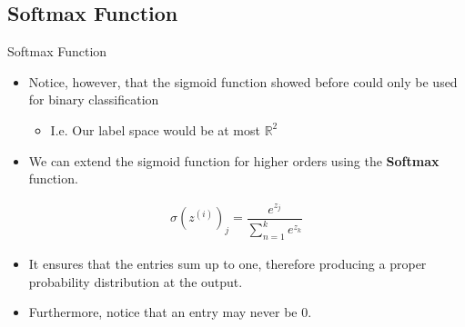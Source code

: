 \subsection{Softmax Function}
\begin{frame}{Softmax Function}
	\begin{itemize}
		\item Notice, however, that the sigmoid function showed before could only be used for binary classification
		\begin{itemize}
			\item I.e. Our label space would be at most $\mathbb{R}^2$
		\end{itemize}
		\item We can extend the sigmoid function for higher orders using the \textbf{Softmax} function.
	\end{itemize}
	\begin{gather*}
	\sigma(z^{(i)})_j = \dfrac{e^{z_j}}{\sum_{n=1}^{k} e^{z_k}}
	\end{gather*}
	\begin{itemize}
		\item It ensures that the entries sum up to one, therefore producing a proper probability distribution at the output.
		\item Furthermore, notice that an entry may never be 0.
	\end{itemize}
\end{frame}


